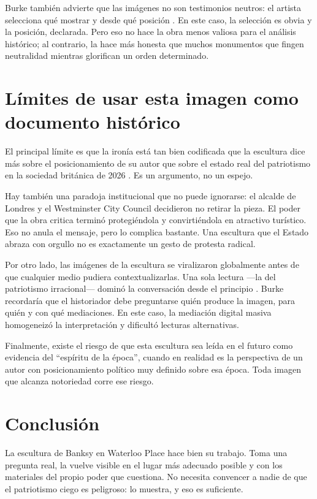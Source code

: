 \documentclass[12pt, a4paper]{article}
\begin{document}
Burke también advierte que las imágenes no son testimonios neutros: el artista selecciona qué mostrar y desde qué posición \cite{burke2001}. En este caso, la selección es obvia y la posición, declarada. Pero eso no hace la obra menos valiosa para el análisis histórico; al contrario, la hace más honesta que muchos monumentos que fingen neutralidad mientras glorifican un orden determinado.

\section{Límites de usar esta imagen como documento histórico}

El principal límite es que la ironía está tan bien codificada que la escultura dice más sobre el posicionamiento de su autor que sobre el estado real del patriotismo en la sociedad británica de 2026 \cite{burke2001}. Es un argumento, no un espejo.

Hay también una paradoja institucional que no puede ignorarse: el alcalde de Londres y el Westminster City Council decidieron no retirar la pieza. El poder que la obra critica terminó protegiéndola y convirtiéndola en atractivo turístico. Eso no anula el mensaje, pero lo complica bastante. Una escultura que el Estado abraza con orgullo no es exactamente un gesto de protesta radical.

Por otro lado, las imágenes de la escultura se viralizaron globalmente antes de que cualquier medio pudiera contextualizarlas. Una sola lectura ---la del patriotismo irracional--- dominó la conversación desde el principio \cite{cbc2026}. Burke recordaría que el historiador debe preguntarse quién produce la imagen, para quién y con qué mediaciones. En este caso, la mediación digital masiva homogeneizó la interpretación y dificultó lecturas alternativas.

Finalmente, existe el riesgo de que esta escultura sea leída en el futuro como evidencia del ``espíritu de la época'', cuando en realidad es la perspectiva de un autor con posicionamiento político muy definido sobre esa época. Toda imagen que alcanza notoriedad corre ese riesgo.

\section*{Conclusión}

La escultura de Banksy en Waterloo Place hace bien su trabajo. Toma una pregunta real, la vuelve visible en el lugar más adecuado posible y con los materiales del propio poder que cuestiona. No necesita convencer a nadie de que el patriotismo ciego es peligroso: lo muestra, y eso es suficiente.
\end{document}
